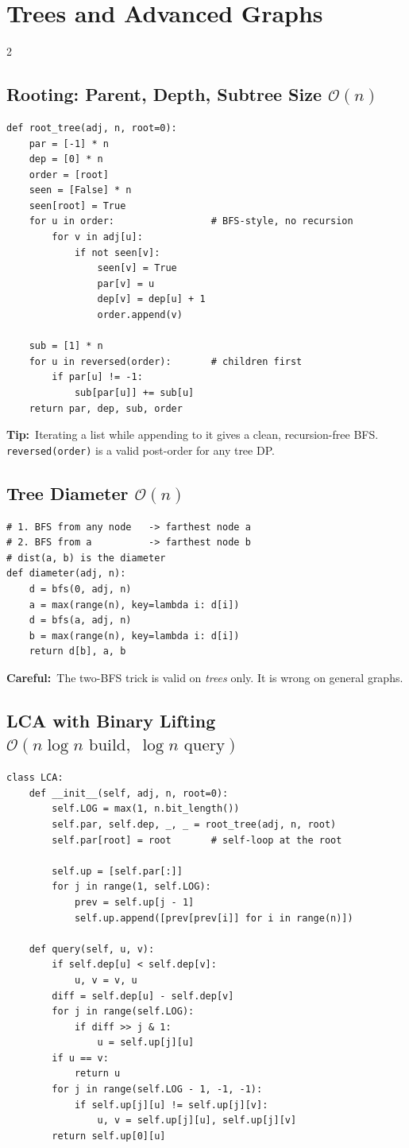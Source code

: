 \documentclass[10pt]{article}
\newcommand{\code}[1]{\texttt{\small #1}}
\newcommand{\sub}[2]{\subsection[#1]{#1\hspace{0.6em}%
  \textnormal{\color{accent2}\small$\mathcal{O}(#2)$}}}
\newcommand{\tip}[1]{{\color{tipc}\footnotesize\textbf{Tip:}}~{\footnotesize #1}\par}
\newcommand{\warn}[1]{{\color{warnc}\footnotesize\textbf{Careful:}}~{\footnotesize #1}\par}
\begin{document}
\section{Trees and Advanced Graphs}
\begin{multicols}{2}

\sub{Rooting: Parent, Depth, Subtree Size}{n}
\begin{lstlisting}
def root_tree(adj, n, root=0):
    par = [-1] * n
    dep = [0] * n
    order = [root]
    seen = [False] * n
    seen[root] = True
    for u in order:                 # BFS-style, no recursion
        for v in adj[u]:
            if not seen[v]:
                seen[v] = True
                par[v] = u
                dep[v] = dep[u] + 1
                order.append(v)

    sub = [1] * n
    for u in reversed(order):       # children first
        if par[u] != -1:
            sub[par[u]] += sub[u]
    return par, dep, sub, order
\end{lstlisting}
\tip{Iterating a list while appending to it gives a clean, recursion-free
BFS. \code{reversed(order)} is a valid post-order for any tree DP.}

\sub{Tree Diameter}{n}
\begin{lstlisting}
# 1. BFS from any node   -> farthest node a
# 2. BFS from a          -> farthest node b
# dist(a, b) is the diameter
def diameter(adj, n):
    d = bfs(0, adj, n)
    a = max(range(n), key=lambda i: d[i])
    d = bfs(a, adj, n)
    b = max(range(n), key=lambda i: d[i])
    return d[b], a, b
\end{lstlisting}
\warn{The two-BFS trick is valid on \emph{trees} only. It is wrong on
general graphs.}

\sub{LCA with Binary Lifting}{n \log n \text{ build},\; \log n \text{ query}}
\begin{lstlisting}
class LCA:
    def __init__(self, adj, n, root=0):
        self.LOG = max(1, n.bit_length())
        self.par, self.dep, _, _ = root_tree(adj, n, root)
        self.par[root] = root       # self-loop at the root

        self.up = [self.par[:]]
        for j in range(1, self.LOG):
            prev = self.up[j - 1]
            self.up.append([prev[prev[i]] for i in range(n)])

    def query(self, u, v):
        if self.dep[u] < self.dep[v]:
            u, v = v, u
        diff = self.dep[u] - self.dep[v]
        for j in range(self.LOG):
            if diff >> j & 1:
                u = self.up[j][u]
        if u == v:
            return u
        for j in range(self.LOG - 1, -1, -1):
            if self.up[j][u] != self.up[j][v]:
                u, v = self.up[j][u], self.up[j][v]
        return self.up[0][u]


\end{lstlisting}
\end{multicols}
\end{document}
